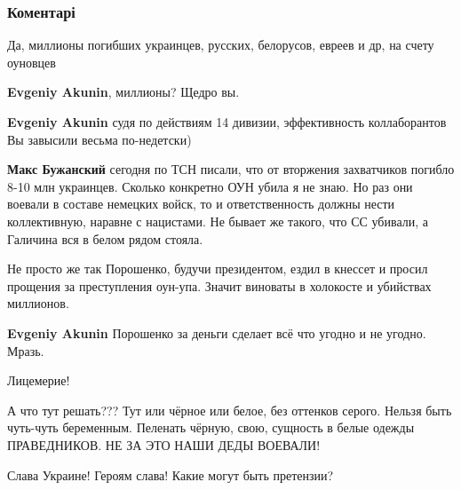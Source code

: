  
 
 
 
 
\subsubsection{Коментарі}
\label{sec:22_06_2021.fb.buzhanskii_max.2.nacizm_napadenie_22_06_1941_oun.cmt}

\begin{itemize}
Да, миллионы погибших украинцев, русских, белорусов, евреев и др, на счету оуновцев

\begin{itemize}
\textbf{Evgeniy Akunin}, миллионы? Щедро вы.

\textbf{Evgeniy Akunin} судя по действиям 14 дивизии, эффективность коллаборантов Вы завысили весьма по-недетски)

\textbf{Макс Бужанский} сегодня по ТСН писали, что от вторжения захватчиков
погибло 8-10 млн украинцев. Сколько конкретно ОУН убила я не знаю. Но раз они
воевали в составе немецких войск, то и ответственность должны нести
коллективную, наравне с нацистами. Не бывает же такого, что СС убивали, а
Галичина вся в белом рядом стояла.

Не просто же так Порошенко, будучи президентом, ездил в кнессет и просил
прощения за преступления оун-упа. Значит виноваты в холокосте и убийствах
миллионов.

\textbf{Evgeniy Akunin} Порошенко за деньги сделает всё что угодно и не угодно. Мразь.
\end{itemize}

Лицемерие!


А что тут решать??? Тут или чёрное или белое, без оттенков серого. Нельзя быть
чуть-чуть беременным. Пеленать чёрную, свою, сущность в белые одежды
ПРАВЕДНИКОВ.  НЕ ЗА ЭТО НАШИ ДЕДЫ ВОЕВАЛИ!

Слава Украине! Героям слава! Какие могут быть претензии?


\end{itemize}
